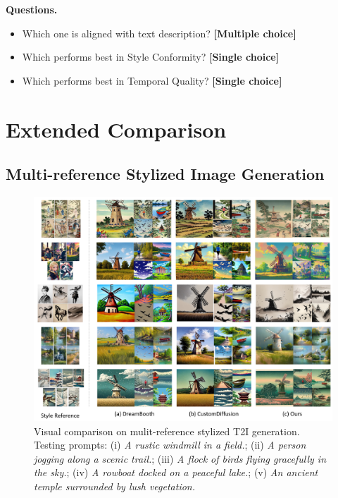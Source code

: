 \noindent\textbf{Questions.}

\begin{itemize}[leftmargin=2.0em]
    \item Which one is aligned with text description? \textbf{[Multiple choice]}
    \item Which performs best in Style Conformity? \textbf{[Single choice]}
    \item Which performs best in Temporal Quality? \textbf{[Single choice]}
\end{itemize}
 

\section{Extended Comparison}
\label{sec:supp_extend_comp}

\subsection{Multi-reference Stylized Image Generation}

\begin{figure}[!h]
    \centering
    \includegraphics[width=0.9\linewidth]{figures/supp/result_comp_multi_ref.pdf}
    \vspace{-1.5em}
    \caption{Visual comparison on mulit-reference stylized T2I generation. Testing prompts: (i) \textit{A rustic windmill in a field.}; (ii) \textit{A person jogging along a scenic trail.}; (iii) \textit{A flock of birds flying gracefully in the sky.}; (iv) \textit{A rowboat docked on a peaceful lake.}; (v) \textit{An ancient temple surrounded by lush vegetation.}} 
    \label{fig:supp_comp_multi_ref}
\end{figure}


